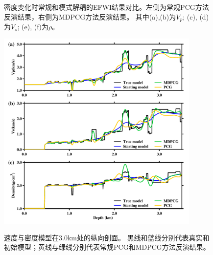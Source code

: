 \begin{figure}
\begin{center}
        \caption{
			密度变化时常规和模式解耦的EFWI结果对比。左侧为常规PCG方法反演结果，右侧为MDPCG方法反演结果。
			其中(a),(b)为$V_p$; (c), (d)为$V_s$; (e), (f)为$\rho$。
		}
    \label{fig:InvertWithRho}
    \end{center}
\end{figure} 
\begin{figure}
    \begin{center}
        {\includegraphics[width=10cm]{Figure/chapter02/tariqsugresult/Fig/3kmrho.pdf}}
        \caption{
			速度与密度模型在3.0km处的纵向剖面。
			黑线和蓝线分别代表真实和初始模型；黄线与绿线分别代表常规PCG和MDPCG方法反演结果。
    }
    \label{fig:RhoProfile3km}
    \end{center}
\end{figure}
